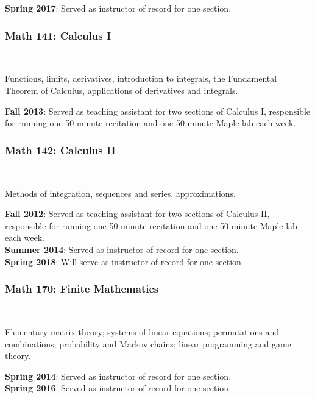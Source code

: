 \documentclass[teaching.portfolio.tex]{subfiles}
\begin{document}
\noindent
\textbf{Spring 2017}: Served as instructor of record for one section.

\subsubsection{Math 141: Calculus I}\hfill\\
\begin{tcolorbox}
  \begin{desc}
    Functions, limits, derivatives, introduction to integrals, the Fundamental Theorem of Calculus, applications of derivatives and integrals.
  \end{desc}
\end{tcolorbox}

\noindent
\textbf{Fall 2013}: Served as teaching assistant for two sections of Calculus I, responsible for running one 50 minute recitation and one 50 minute Maple lab each week.

\subsubsection{Math 142: Calculus II}\hfill\\
\begin{tcolorbox}
  \begin{desc}
    Methods of integration, sequences and series, approximations.
  \end{desc}
  \end{tcolorbox}

\noindent
\textbf{Fall 2012}: Served as teaching assistant for two sections of Calculus II, responsible for running one 50 minute recitation and one 50 minute Maple lab each week.\\
\textbf{Summer 2014}: Served as instructor of record for one section.\\
\textbf{Spring 2018}: Will serve as instructor of record for one section.

\subsubsection{Math 170: Finite Mathematics}\hfill\\
\begin{tcolorbox}
  \begin{desc}
    Elementary matrix theory; systems of linear equations; permutations and combinations; probability and Markov chains; linear programming and game theory.
  \end{desc}
\end{tcolorbox}

\noindent
\textbf{Spring 2014}: Served as instructor of record for one section.\\
\textbf{Spring 2016}: Served as instructor of record for one section.
\end{document}
